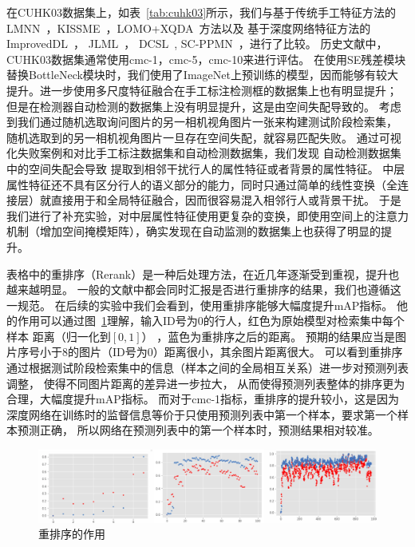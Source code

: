 在CUHK03数据集上，如表~\ref{tab:cuhk03}所示，我们与基于传统手工特征方法的 LMNN~\cite{lmnn}，KISSME~\cite{kissme}，LOMO+XQDA~\cite{xqda}方法以及
基于深度网络特征方法的 ImprovedDL~\cite{improveddl}， JLML~\cite{jlml}， DCSL~\cite{yaqing2016semantics}, SC-PPMN~\cite{mao2018multi}，进行了比较。
历史文献中，CUHK03数据集通常使用cmc-1，cmc-5，cmc-10来进行评估。
在使用SE残差模块替换BottleNeck模块时，我们使用了ImageNet上预训练的模型，因而能够有较大提升。进一步使用多尺度特征融合在手工标注检测框的数据集上也有明显提升；
但是在检测器自动检测的数据集上没有明显提升，这是由空间失配导致的。
考虑到我们通过随机选取询问图片的另一相机视角图片一张来构建测试阶段检索集，
随机选取到的另一相机视角图片一旦存在空间失配，就容易匹配失败。
通过可视化失败案例和对比手工标注数据集和自动检测数据集，我们发现
自动检测数据集中的空间失配会导致
提取到相邻干扰行人的属性特征或者背景的属性特征。
中层属性特征还不具有区分行人的语义部分的能力，同时只通过简单的线性变换（全连接层）就直接用于和全局特征融合，因而很容易混入相邻行人或背景干扰。
于是我们进行了补充实验，对中层属性特征使用更复杂的变换，即使用空间上的注意力机制（增加空间掩模矩阵），确实发现在自动监测的数据集上也获得了明显的提升。

表格中的重排序（Rerank）是一种后处理方法，在近几年逐渐受到重视，提升也越来越明显。
一般的文献中都会同时汇报是否进行重排序的结果，我们也遵循这一规范。
在后续的实验中我们会看到，使用重排序能够大幅度提升mAP指标。
他的作用可以通过图~\ref{fig:rerank}理解，输入ID号为0的行人，红色为原始模型对检索集中每个样本
距离（归一化到$[0,1]$）
，蓝色为重排序之后的距离。
预期的结果应当是图片序号小于8的图片（ID号为0）距离很小，其余图片距离很大。
可以看到重排序通过根据测试阶段检索集中的信息（样本之间的全局相互关系）进一步对预测列表调整，
使得不同图片距离的差异进一步拉大，
从而使得预测列表整体的排序更为合理，大幅度提升mAP指标。
而对于cmc-1指标，重排序的提升较小，这是因为深度网络在训练时的监督信息等价于只使用预测列表中第一个样本，要求第一个样本预测正确，
所以网络在预测列表中的第一个样本时，预测结果相对较准。

\begin{figure}
	\centering 
	\includegraphics[width=\textwidth]{fig/2018-05-19-23-28-21.png}
	\caption{重排序的作用} \label{fig:rerank}
\end{figure}

